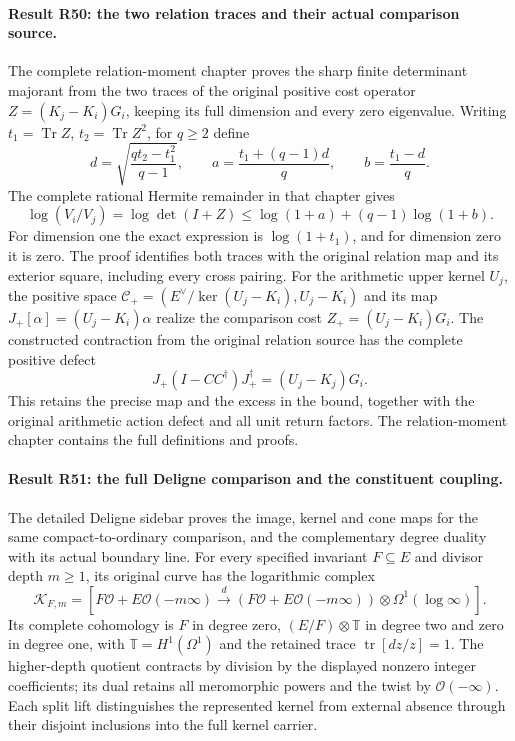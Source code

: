 \paragraph{Result R50: the two relation traces and their actual comparison source.}
The complete relation-moment chapter proves the sharp finite determinant
majorant from the two traces of the original positive cost operator
\(Z=(K_j-K_i)G_i\), keeping its full dimension and every zero eigenvalue.
Writing \(t_1=\operatorname{Tr}Z\), \(t_2=\operatorname{Tr}Z^2\), for
\(q\ge2\) define
\[
 d=\sqrt{\frac{qt_2-t_1^2}{q-1}},\qquad
 a=\frac{t_1+(q-1)d}{q},\qquad b=\frac{t_1-d}{q}.
\]
The complete rational Hermite remainder in that chapter gives
\[
 \log(V_i/V_j)=\log\det(I+Z)
 \le\log(1+a)+(q-1)\log(1+b).
\]
For dimension one the exact expression is \(\log(1+t_1)\), and for
dimension zero it is zero. The proof identifies both traces with
the original relation map and its exterior square, including every
cross pairing. For the arithmetic upper kernel \(U_j\), the positive
space \(\mathcal C_+=(E^\vee/\ker(U_j-K_i),U_j-K_i)\) and its map
\(J_+[\alpha]=(U_j-K_i)\alpha\) realize the comparison cost
\(Z_+=(U_j-K_i)G_i\). The constructed contraction from the original
relation source has the complete positive defect
\[
 J_+(I-CC^\dagger)J_+^\dagger=(U_j-K_j)G_i.
\]
This retains the precise map and the excess in the bound, together
with the original arithmetic action defect and all unit return factors.
The relation-moment chapter contains the full definitions and proofs.

\paragraph{Result R51: the full Deligne comparison and the constituent coupling.}
The detailed Deligne sidebar proves the image, kernel and cone maps
for the same compact-to-ordinary comparison, and the complementary
degree duality with its actual boundary line. For every specified
invariant \(F\subseteq E\) and divisor depth \(m\ge1\), its original
curve has the logarithmic complex
\[
 \mathscr K_{F,m}=
 [F\mathcal O+E\mathcal O(-m\infty)
   \xrightarrow d(F\mathcal O+E\mathcal O(-m\infty))
                       \otimes\Omega^1(\log\infty)].
\]
Its complete cohomology is \(F\) in degree zero,
\((E/F)\otimes\mathbb T\) in degree two and zero in degree one,
with \(\mathbb T=H^1(\Omega^1)\) and the retained trace
\(\operatorname{tr}[dz/z]=1\). The higher-depth quotient contracts
by division by the displayed nonzero integer coefficients; its
dual retains all meromorphic powers and the twist by
\(\mathcal O(-\infty)\). Each split lift distinguishes the represented
kernel from external absence through their disjoint inclusions into
the full kernel carrier.

